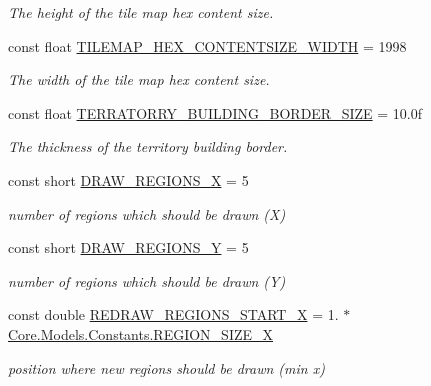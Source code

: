 \begin{DoxyCompactItemize}
\begin{DoxyCompactList}\small\item\em The height of the tile map hex content size. \end{DoxyCompactList}\item 
const float \hyperlink{classClient_1_1Common_1_1Constants_1_1ClientConstants_af27377a5580d95e09167aa76fd8d2b6f}{T\+I\+L\+E\+M\+A\+P\+\_\+\+H\+E\+X\+\_\+\+C\+O\+N\+T\+E\+N\+T\+S\+I\+Z\+E\+\_\+\+W\+I\+D\+T\+H} = 1998
\begin{DoxyCompactList}\small\item\em The width of the tile map hex content size. \end{DoxyCompactList}\item 
const float \hyperlink{classClient_1_1Common_1_1Constants_1_1ClientConstants_a86e7197847b9426d7cfe973eb0b6ac6a}{T\+E\+R\+R\+A\+T\+O\+R\+R\+Y\+\_\+\+B\+U\+I\+L\+D\+I\+N\+G\+\_\+\+B\+O\+R\+D\+E\+R\+\_\+\+S\+I\+Z\+E} = 10.\+0f
\begin{DoxyCompactList}\small\item\em The thickness of the territory building border. \end{DoxyCompactList}\item 
const short \hyperlink{classClient_1_1Common_1_1Constants_1_1ClientConstants_af98255a5585f6759d7b310c3d88fc78a}{D\+R\+A\+W\+\_\+\+R\+E\+G\+I\+O\+N\+S\+\_\+\+X} = 5
\begin{DoxyCompactList}\small\item\em number of regions which should be drawn (X) \end{DoxyCompactList}\item 
const short \hyperlink{classClient_1_1Common_1_1Constants_1_1ClientConstants_ae833bc65e6c55f89addf71ff1cb39fba}{D\+R\+A\+W\+\_\+\+R\+E\+G\+I\+O\+N\+S\+\_\+\+Y} = 5
\begin{DoxyCompactList}\small\item\em number of regions which should be drawn (Y) \end{DoxyCompactList}\item 
const double \hyperlink{classClient_1_1Common_1_1Constants_1_1ClientConstants_a6dfd33707a009763341cd6039ede0289}{R\+E\+D\+R\+A\+W\+\_\+\+R\+E\+G\+I\+O\+N\+S\+\_\+\+S\+T\+A\+R\+T\+\_\+\+X} = 1. $\ast$ \hyperlink{classCore_1_1Models_1_1Constants_a2d02174b6a70404c1d8093c81eb47cb2}{Core.\+Models.\+Constants.\+R\+E\+G\+I\+O\+N\+\_\+\+S\+I\+Z\+E\+\_\+\+X}
\begin{DoxyCompactList}\small\item\em position where new regions should be drawn (min x) \end{DoxyCompactList}\item 

\end{DoxyCompactItemize}
